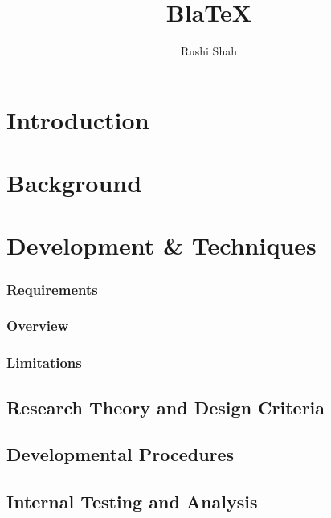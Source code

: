 \documentclass[doc,apacite,12pt]{apa6}
\title{BlaTeX}
\author{Rushi Shah}
\affiliation{TJHSST}
\begin{document}
\maketitle    


         
\section{Introduction}


\section{Background}


\section{Development \& Techniques}

\subsubsection{Requirements}


\subsubsection{Overview}


\subsubsection{Limitations}


\subsection{Research Theory and Design Criteria}


\subsection{Developmental Procedures}


\subsection{Internal Testing and Analysis}

\end{document}
